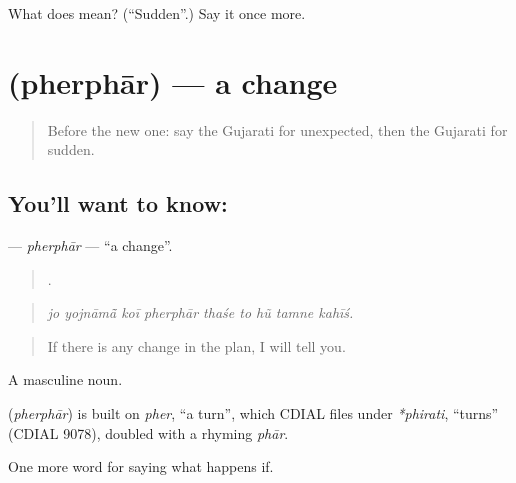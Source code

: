 \begin{tcolorbox}[breakable,colback=teal!4,colframe=teal!35!black,title={Before you move on}]
What does  mean? (\textquotedblleft{}Sudden\textquotedblright{}.) Say it once more.
\end{tcolorbox}
\section[\texorpdfstring{\gu{ફેરફાર} (pherphār)}{ફેરફાર (pherphār)}]{ (pherphār) — a change}

\label{lesson:GU-C531-pherphar}



\begin{quote}
Before the new one: say the Gujarati for unexpected, then the Gujarati for sudden.
\end{quote}

\subsection*{You'll want to know: }
\textbf{} — \emph{pherphār} — \textquotedblleft{}a change\textquotedblright{}.

\begin{quote}
        .
\end{quote}

\begin{quote}
\emph{jo yojnāmā̃ koī pherphār thaśe to hũ tamne kahīś.}
\end{quote}

\begin{quote}
If there is any change in the plan, I will tell you.
\end{quote}

A masculine noun.

\begin{cousinweb}
\textbf{} (\emph{pherphār}) is built on \emph{pher}, \textquotedblleft{}a turn\textquotedblright{}, which CDIAL files under \emph{*phirati}, \textquotedblleft{}turns\textquotedblright{} (CDIAL 9078), doubled with a rhyming \emph{phār}.
\end{cousinweb}

\begin{grammarlens}[title={What you've built}]
One more word for saying what happens if.
\end{grammarlens}

